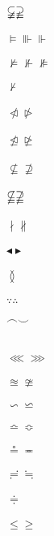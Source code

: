 \documentclass{article}
\begin{document}
$\varsubsetneqq \varsupsetneqq$\\\\
$\vDash \Vvdash \Vdash$\\\\
$\nvDash \nVdash \nVDash$\\\\
$\nvdash$\\\\
$\ntriangleleft \ntriangleright$\\\\
$\ntrianglelefteq \ntrianglerighteq$\\\\
$\nsubseteq \nsupseteq$\\\\
$\nsubseteqq \nsupseteqq$\\\\
$\nmid \nparallel$\\\\
$\blacktriangleleft \blacktriangleright$\\\\
$\between$\\\\
$\because \therefore$\\\\
$\smallfrown \smallsmile$\\\\
\\
$\lll \ggg$\\\\
$\approxeq \ncong $\\\\
$\backsim \backsimeq$\\\\
$\bumpeq \Bumpeq $\\\\
$\circeq \eqcirc $\\\\
$\risingdotseq \fallingdotseq $\\\\
$\doteqdot $\\\\
$\leqslant \geqslant $\\\\
\end{document}
